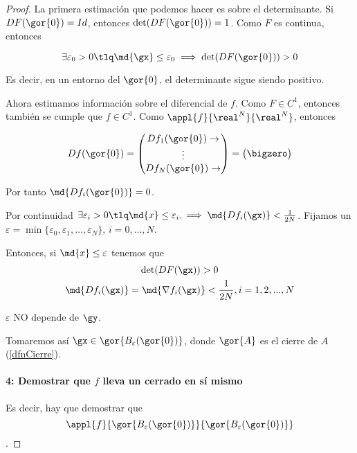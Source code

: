 \begin{proof}
 La primera estimación que podemos hacer es sobre el determinante. Si $DF(\gor{0}) = Id$, entonces $\det(DF(\gor{0})) = 1$. Como $F$ es continua, entonces 
 
 \[ \exists \varepsilon_0 >0 \tlq \md{\gx} \leq \varepsilon_0 \implies  \det(DF(\gor{0}))>0 \]
 
  Es decir, en un entorno del $\gor{0}$, el determinante sigue siendo positivo.
  
  
 Ahora estimamos información sobre el diferencial de $f$. Como $F\in C^1$, entonces también se cumple que $f \in C^1$. Como $\appl{f}{\real^N}{\real^N}$, entonces
  
  \[ Df(\gor{0}) = \begin{pmatrix}
                  Df_1(\gor{0}) \rightarrow\\
                  \vdots\\
                  Df_N(\gor{0}) \rightarrow
                 \end{pmatrix} = \begin{pmatrix}  \bigzero \end{pmatrix} \]
                 
 Por tanto $\md{Df_i(\gor{0})} = 0$.
 
 Por continuidad $\exists \varepsilon_i > 0 \tlq \md{x} \leq \varepsilon_i, \implies \md{Df_i(\gx)} <\frac{1}{2N}$. Fijamos un $\varepsilon = \min \{\varepsilon_0,\varepsilon_1,\dotsc, \varepsilon_N\} ,\, i=0,\dotsc,N$.
 
 Entonces, si $\md{x} \leq \varepsilon$ tenemos  que
\begin{gather}
\det(DF(\gx))>0 \label{eqFinv_DetF} \\
\md{Df_i(\gx)}  = \md{\nabla f_i(\gx)} < \dfrac{1}{2N}, i=1,2,...,N \label{eqFinv_Detfi}
\end{gather}
                                            
 \begin{remark} $\varepsilon$ NO depende de $\gy$. \end{remark}

 
  Tomaremos así $\gx\in \gor{B_\varepsilon(\gor{0})}$, donde $\gor{A}$ es el cierre de $A$ (\ref{dfnCierre}).
  
  \paragraph{4: Demostrar que $f$ lleva un cerrado en sí mismo}
  
Es decir, hay que demostrar que \[ \appl{f}{ \gor{B_\varepsilon(\gor{0})}}{ \gor{B_\varepsilon(\gor{0})}} \].
  

\end{proof}
